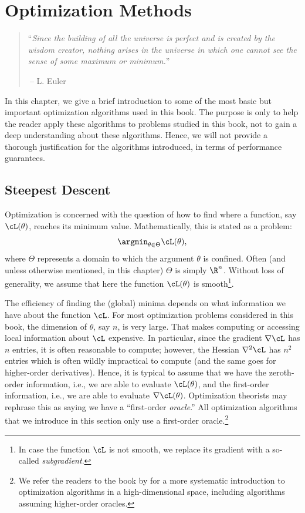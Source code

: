 \documentclass[../../book-main.tex]{subfiles}
\begin{document}
\chapter{Optimization Methods}
\label{app:optimization}

\begin{quote}
    ``{\em Since the building of all the universe is perfect and is
        created by the wisdom creator, nothing arises in the universe in
    which one cannot see the sense of some maximum or minimum.}''

    $~$\hfill -- L. Euler
\end{quote}
\vspace{5mm}

In this chapter, we give a brief introduction to some of the most
basic but important optimization algorithms used in this book. The
purpose is only to help the reader apply these algorithms to problems
studied in this book, not to gain a deep understanding about these
algorithms. Hence, we will not provide a thorough justification for
the algorithms introduced, in terms of  performance guarantees.

\section{Steepest Descent}

Optimization is concerned with the question of how to find where a
function, say \(\cL(\theta)\), reaches its minimum value.
Mathematically, this is stated as a problem:
\begin{equation}
    \argmin_{\theta \in \Theta} \cL(\theta),
\end{equation}
where \(\Theta\) represents a domain to which the argument \(\theta\)
is confined. Often (and unless otherwise mentioned, in this chapter)
\(\Theta\) is simply \(\R^{n}\). Without loss of generality, we
assume that here the function \(\cL(\theta)\) is smooth\footnote{In
    case the function \(\cL\) is not smooth, we replace its gradient with
a so-called \textit{subgradient}.}.

The efficiency of finding the (global) minima depends on what
information we have about the function \(\cL\). For most optimization
problems considered in this book, the dimension of \(\theta\), say
\(n\), is very large. That makes computing or accessing local
information about \(\cL\) expensive. In particular, since the
gradient \(\nabla \cL\) has \(n\) entries, it is often reasonable to
compute; however, the Hessian \(\nabla^{2} \cL\) has \(n^{2}\)
entries which is often wildly impractical to compute (and the same
goes for higher-order derivatives). Hence, it is typical to assume
that we have the zeroth-order information, i.e., we are able to
evaluate \(\cL(\theta)\), and the first-order information, i.e., we
are able to evaluate \(\nabla \cL(\theta)\). Optimization theorists
may rephrase this as saying we have a ``first-order
\textit{oracle}.'' All optimization algorithms that we introduce in
this section only use a first-order oracle.\footnote{We refer the
    readers to the book by \cite{Wright-Ma-2022} for a more systematic
    introduction to optimization algorithms in a high-dimensional space,
including algorithms assuming higher-order oracles.}
\end{document}
